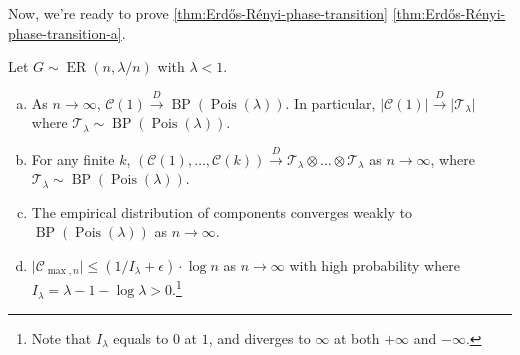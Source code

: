 Now, we're ready to prove \autoref{thm:Erdős-Rényi-phase-transition} \autoref{thm:Erdős-Rényi-phase-transition-a}.

\begin{lemma}\label{lma:component-of-subcritical-Erdős-Rényi-graph}
	Let \(G \sim \operatorname{ER}(n, \lambda / n) \) with \(\lambda < 1\).
	\begin{enumerate}[(a)]
		\item\label{lma:component-of-subcritical-Erdős-Rényi-graph-a} As \(n\to \infty \), \(\mathcal{C} (1) \overset{D}{\to} \operatorname{BP}(\operatorname{Pois}(\lambda ) ) \). In particular, \(\lvert \mathcal{C} (1) \rvert \overset{D}{\to} \lvert \mathcal{T} _\lambda  \rvert \) where \(\mathcal{T} _\lambda \sim \operatorname{BP}(\operatorname{Pois}(\lambda ) )\).
		\item\label{lma:component-of-subcritical-Erdős-Rényi-graph-b} For any finite \(k\), \((\mathcal{C} (1), \dots , \mathcal{C} (k)) \overset{D}{\to} \mathcal{T} _\lambda \otimes \dots \otimes \mathcal{T} _\lambda \) as \(n\to \infty \), where \(\mathcal{T} _\lambda \sim \operatorname{BP}(\operatorname{Pois}(\lambda ) )\).
		\item\label{lma:component-of-subcritical-Erdős-Rényi-graph-c} The empirical distribution of components converges weakly to \(\operatorname{BP}(\operatorname{Pois}(\lambda ) ) \) as \(n\to \infty \).
		\item\label{lma:component-of-subcritical-Erdős-Rényi-graph-d} \(\lvert \mathcal{C} _{\max , n} \rvert \leq (1 / I_\lambda + \epsilon ) \cdot \log n\) as \(n\to \infty \) with high probability where \(I_\lambda = \lambda - 1 - \log \lambda > 0\).\footnote{Note that \(I_\lambda \) equals to \(0\) at \(1\), and diverges to \(\infty \) at both \(+\infty \) and \(-\infty \).}
	\end{enumerate}
\end{lemma}
